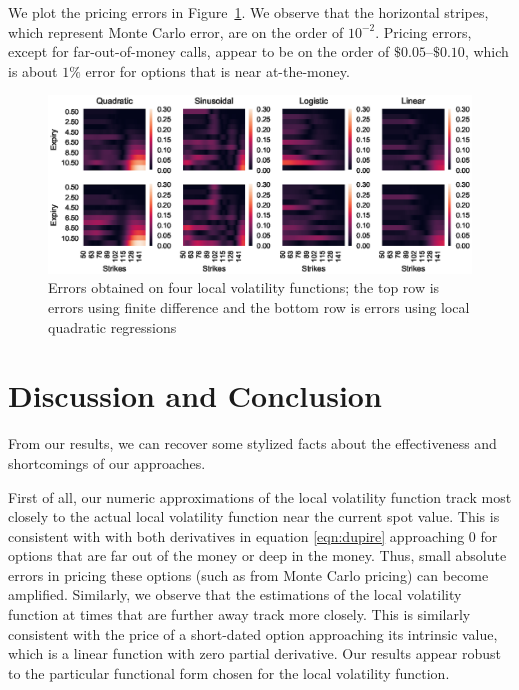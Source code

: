 \documentclass[11pt]{article}
\numberwithin{equation}{section}
\begin{document}
We plot the pricing errors in Figure~\ref{fig:errors}. We observe that the
horizontal stripes, which represent Monte Carlo error, are on the order of
$10^{-2}$. Pricing errors, except for far-out-of-money calls, appear to be on
the order of $\$0.05$--$\$0.10$, which is about $1\%$ error for options that is
near at-the-money.

\begin{figure}[h!]
  \centering
  \includegraphics{figs/errors.eps}
  \caption{Errors obtained on four local volatility functions; the top row is
     errors using finite difference and the bottom row is errors using local
     quadratic regressions}
  \label{fig:errors}
\end{figure}


\section{Discussion and Conclusion}
\label{sec:conc}

From our results, we can recover some stylized facts about the effectiveness and
shortcomings of our approaches. 

First of all, our numeric approximations of the local volatility function track
most closely to the actual local volatility function near the current spot
value. This is consistent with with both derivatives in equation
\ref{eqn:dupire} approaching 0 for options that are far out of the money or deep
in the money. Thus, small absolute errors in pricing these options (such as from
Monte Carlo pricing) can become amplified. Similarly, we observe that the
estimations of the local volatility function at times that are further away
track more closely. This is similarly consistent with the price of a short-dated
option approaching its intrinsic value, which is a linear function with zero
partial derivative. Our results appear robust to the particular functional form
chosen for the local volatility function.
\end{document}
